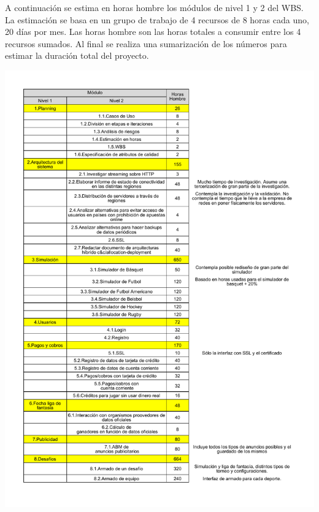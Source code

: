 A continuación se estima en horas hombre los módulos de nivel 1 y 2 del WBS. La estimación se basa en un grupo de trabajo de 4 recursos de 8 horas cada uno, 20 días por mes. Las horas hombre son las horas totales a consumir entre los 4 recursos sumados. Al final se realiza una sumarización de los números para estimar la duración total del proyecto.

\includegraphics[width=\textwidth, page=1, clip, trim=20 0 20 30]{imagenes/estimacionModulos.pdf}

